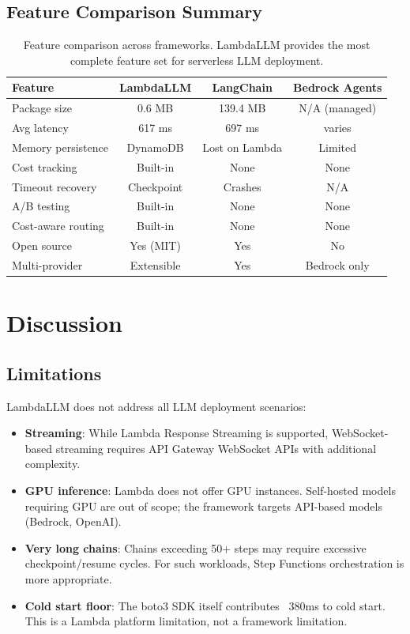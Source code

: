 \documentclass[11pt,a4paper]{article}
\begin{document}
\subsection{Feature Comparison Summary}

\begin{table}[h]
\centering
\begin{tabular}{lccc}
\toprule
\textbf{Feature} & \textbf{LambdaLLM} & \textbf{LangChain} & \textbf{Bedrock Agents} \\
\midrule
Package size & 0.6 MB & 139.4 MB & N/A (managed) \\
Avg latency & 617 ms & 697 ms & varies \\
Memory persistence & DynamoDB & Lost on Lambda & Limited \\
Cost tracking & Built-in & None & None \\
Timeout recovery & Checkpoint & Crashes & N/A \\
A/B testing & Built-in & None & None \\
Cost-aware routing & Built-in & None & None \\
Open source & Yes (MIT) & Yes & No \\
Multi-provider & Extensible & Yes & Bedrock only \\
\bottomrule
\end{tabular}
\caption{Feature comparison across frameworks. LambdaLLM provides the most complete feature set for serverless LLM deployment.}
\end{table}

\section{Discussion}

\subsection{Limitations}

LambdaLLM does not address all LLM deployment scenarios:

\begin{itemize}
    \item \textbf{Streaming}: While Lambda Response Streaming is supported, WebSocket-based streaming requires API Gateway WebSocket APIs with additional complexity.
    \item \textbf{GPU inference}: Lambda does not offer GPU instances. Self-hosted models requiring GPU are out of scope; the framework targets API-based models (Bedrock, OpenAI).
    \item \textbf{Very long chains}: Chains exceeding 50+ steps may require excessive checkpoint/resume cycles. For such workloads, Step Functions orchestration is more appropriate.
    \item \textbf{Cold start floor}: The boto3 SDK itself contributes ~380ms to cold start. This is a Lambda platform limitation, not a framework limitation.
\end{itemize}
\end{document}
